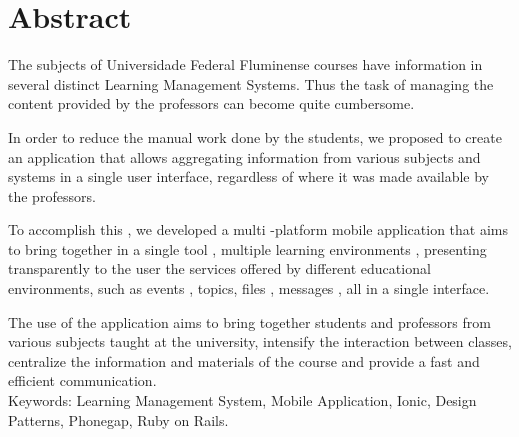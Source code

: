 
\chapter*{Abstract}

\thispagestyle{myheadings}

The subjects of Universidade Federal Fluminense courses have information in several distinct Learning Management Systems. Thus the task of managing the content provided by the professors can become quite cumbersome.

In order to reduce the manual work done by the students, we proposed to create an application that allows aggregating information from various subjects and systems in a single user interface, regardless of where it was made available by the professors.

To accomplish this , we developed a multi -platform mobile application that aims to bring together in a single tool , multiple learning environments , presenting transparently to the user the services offered by different educational environments, such as events , topics, files , messages , all in a single interface.

The use of the application aims to bring together students and professors from various subjects taught at the university, intensify the interaction between classes, centralize the information and materials of the course and provide a fast and efficient communication. \\

Keywords: Learning Management System, Mobile Application, Ionic, Design Patterns, Phonegap, Ruby on Rails.

